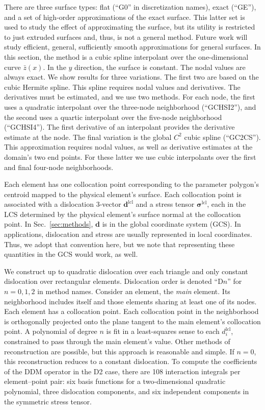 \documentclass[11pt]{article}
\renewcommand{\vec}[1]{\boldsymbol{#1}}
\newcommand{\mat}[1]{\boldsymbol{#1}}
\newcommand{\suplcl}[1]{#1^{\mathrm{lcl}}}
\begin{document}
There are three surface types: flat (``G0'' in discretization names), exact (``GE''),
and a set of high-order approximations of the exact surface.
This latter set is used to study the effect of approximating the surface,
but its utility is restricted to just extruded surfaces
and, thus, is not a general method.
Future work will study efficient, general, sufficiently smooth approximations for general surfaces.
In this section, the method is a cubic spline interpolant over the one-dimensional curve $\bar{z}(x)$.
In the $y$ direction, the surface is constant.
The nodal values are always exact.
We show results for three variations.
The first two are based on the cubic Hermite spline.
This spline requires nodal values and derivatives.
The derivatives must be estimated, and we use two methods.
For each node,
the first uses a quadratic interpolant over the three-node neighborhood (``GCHSI2''),
and the second uses a quartic interpolant over the five-node neighborhood (``GCHSI4'').
The first derivative of an interpolant provides the derivative estimate at the node.
The final variation is the global $C^2$ cubic spline (``GC2CS'').
This approximation requires nodal values,
as well as derivative estimates at the domain's two end points.
For these latter we use cubic interpolants over the first and final four-node neighborhoods.

Each element has one collocation point corresponding to the parameter polygon's centroid
mapped to the physical element's surface.
Each collocation point is associated with
a dislocation 3-vector $\suplcl{\vec{d}}$
and a stress tensor $\suplcl{\mat{\sigma}}$,
each in the LCS determined by the physical element's surface normal at the collocation point.
In Sec.~\ref{sec:methods}, $\vec{d}$ is in the global coordinate system (GCS).
In applications, dislocation and stress are usually represented in local coordinates.
Thus, we adopt that convention here,
but we note that representing these quantities in the GCS would work, as well.

We construct up to quadratic dislocation over each triangle
and only constant dislocation over rectangular elements.
Dislocation order is denoted ``D$n$'' for $n=0,1,2$ in method names.
Consider an element, the \emph{main} element.
Its neighborhood includes itself and those elements sharing at least one of its nodes.
Each element has a collocation point.
Each collocation point in the neighborhood
is orthogonally projected onto the plane tangent to the main element's collocation point.
A polynomial of degree $n$ is fit in a least-squares sense to each $\suplcl{d}_i$,
constrained to pass through the main element's value.
Other methods of reconstruction are possible,
but this approach is reasonable and simple.
If $n=0$, this reconstruction reduces to a constant dislocation.
To compute the coefficients of the DDM operator in the D2 case,
there are 108 interaction integrals per element--point pair:
six basis functions for a two-dimensional quadratic polynomial,
three dislocation components,
and six independent components in the symmetric stress tensor.
\end{document}

